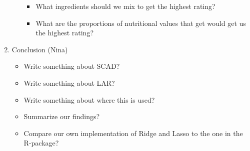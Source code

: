 \begin{enumerate}
\begin{enumerate}
        \begin{itemize}
            \item What ingredients should we mix to get the highest rating?
            \item What are the proportions of nutritional values that get would get us the highest rating?
        \end{itemize}
    \end{enumerate}
    \item Conclusion (Nina)
    \begin{itemize}
        \item Write something about SCAD?
        \item Write something about LAR?
        \item Write something about where this is used?
        \item Summarize our findings?
        \item Compare our own implementation of Ridge and Lasso to the one in the R-package?
    \end{itemize}
\end{enumerate}